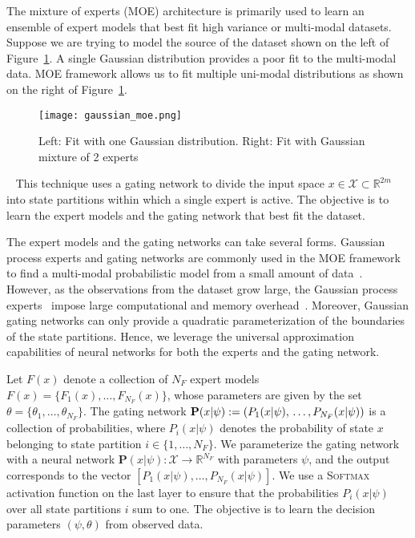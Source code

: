The mixture of experts (MOE) architecture is primarily used to learn an ensemble
of expert models that best fit high variance or multi-modal datasets.
%
Suppose we are trying to model the source of the dataset shown on the left of
Figure~\ref{fig:gaussian_moe}.
%
A single Gaussian distribution provides a poor fit to the multi-modal data.
%
MOE framework allows us to fit multiple uni-modal distributions as shown on
the right of Figure~\ref{fig:gaussian_moe}.
\begin{figure}[tb]
  \centering
  \texttt{[image: gaussian\_moe.png]}
  \caption{Left: Fit with one Gaussian distribution. Right: Fit with Gaussian
  mixture of 2 experts~\cite{mcgonagle_dobre_pilling}}
  \label{fig:gaussian_moe}
\end{figure}~
%
This technique uses a gating network to divide the input space $x \in
\mathcal{X} \subset \mathbb{R}^{2m}$ into state partitions within which a single
expert is active.
%
The objective is to learn the expert models and the gating network that
best fit the dataset.
%

The expert models and the gating networks can take several forms. 
%
Gaussian process experts and gating networks are commonly used in the MOE framework to
find a multi-modal probabilistic model from a small amount of
data~\cite{bishop2006pattern}.
%
However, as the observations from the dataset grow large, the Gaussian process
experts~
impose large computational and memory overhead~\cite{harkonen2022mixtures}.
%
Moreover, Gaussian gating networks can only provide a quadratic parameterization
of the boundaries of the state partitions.
%
Hence, we leverage the universal approximation capabilities of neural networks
for both the experts and the gating network.
%


Let $F(x)$ denote a collection of $N_F$ expert models $F(x) = \{F_1(x),
\dots, F_{N_{F}}(x)\}$, whose parameters are given by the set
$\theta=\{\theta_1, \dots, \theta_{N_{F}} \}$.
%
%
The gating network $\mathbf{P}(x| \psi) := (P_1(x| \psi), \\ \dots, P_{N_F}(x|
\psi))$ is a collection of probabilities, where $P_i(x | \psi)$ denotes the
probability of state $x$ belonging to state partition $i \in \{1, \dots, N_F \}$. 
%
We parameterize the gating network with a neural network $\mathbf{P}(x| \psi) :
\mathcal{X} \rightarrow \mathbb{R}^{N_F}$ with parameters $\psi$, and the output
corresponds to the vector $[P_1(x| \psi), \dots, P_{N_F}(x| \psi)]$.
%
We use a \textsc{Softmax} activation function on the last layer to ensure that the
probabilities $P_i(x | \psi)$ over all state partitions $i$ sum to one.
%
The objective is to learn the decision parameters $(\psi, \theta)$ from observed
data.

